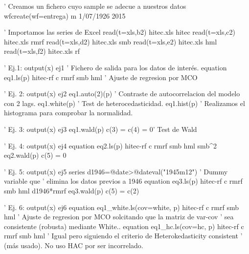 

' Creamos un fichero cuyo sample se adecue a nuestros datos
wfcreate(wf=entrega) m 1/07/1926 2015

' Importamos las series de Excel
read(t=xls,b2) hitec.xls hitec
read(t=xls,c2) hitec.xls rmrf
read(t=xls,d2) hitec.xls smb
read(t=xls,e2) hitec.xls hml
read(t=xls,f2) hitec.xls rf

' Ej.1: 
output(x) ej1 ' Fichero de salida para los datos de interés.
equation eq1.ls(p) hitec-rf c rmrf smb hml ' Ajuste de regresion por MCO 

' Ej. 2:
output(x) ej2
eq1.auto(2)(p)   ' Contraste de autocorrelacion del modelo con 2 lags.
eq1.white(p) ' Test de heterocedasticidad.
eq1.hist(p) ' Realizamos el histograma para comprobar la normalidad.

' Ej. 3:
output(x) ej3
eq1.wald(p) c(3) = c(4) = 0' Test de Wald

' Ej. 4:
output(x) ej4
equation eq2.ls(p) hitec-rf c rmrf smb hml smb^2
eq2.wald(p) c(5) = 0

' Ej. 5:
output(x) ej5
series d1946=@date>@dateval("1945m12") ' Dummy variable que 
' elimina los datos previos a 1946
equation eq3.ls(p) hitec-rf c rmrf smb hml d1946*rmrf
eq3.wald(p) c(5) = c(2)

' Ej. 6:
output(x) ej6
equation eq1_white.ls(cov=white, p) hitec-rf c rmrf smb hml 
' Ajuste de regresion por MCO solcitando que la matriz de var-cov
' sea consistente (robusta) mediante White..
equation eq1_hc.ls(cov=hc, p) hitec-rf c rmrf smb hml 
' Igual pero siguiendo el criterio de Heterokedasticity consistent
' (más usado). No uso HAC por ser incorrelado.

